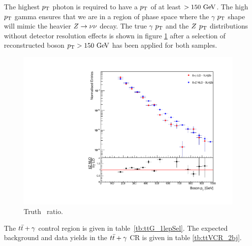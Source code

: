 \indent The highest $p_{\mathrm{T}}$ photon is required to have a $p_{\mathrm{T}}$ of at least $>150\gev$.  The high $p_{\mathrm{T}}$ gamma ensures that we are in a region of phase space where the $\gamma$ $p_{\mathrm{T}}$ shape will mimic the heavier $Z\rightarrow\nu\nu$ decay.  The true $\gamma$ $p_{\mathrm{T}}$ and the $Z$ $p_{\mathrm{T}}$ distributions without detector resolution effects is shown in figure \ref{fig:ttZ_vs_ttGamma_pt} after a selection of reconstructed boson $\pt > 150 \gev$ has been applied for both samples. \\

\begin{figure}[htpb]
\centering
\includegraphics[scale=0.4, angle=270]{figures/ttGamma/TruthStudies/Pt150.pdf}
\caption{Truth \pT\ ratio.}
\label{fig:ttZ_vs_ttGamma_pt}
\end{figure}

\indent The $t\bar{t}+\gamma$ control region is given in table~\ref{tb:ttG_1lepSel}.  The expected background and data yields in the $t\bar{t}+\gamma$ CR is given in table \ref{tb:ttVCR_2bj}. \\


